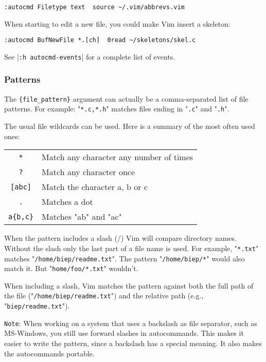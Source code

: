 {\begin{Verbatim}[samepage=true]
 :autocmd Filetype text  source ~/.vim/abbrevs.vim
\end{Verbatim}

When starting to edit a new file, you could make Vim insert a skeleton:

\begin{Verbatim}[samepage=true]
 :autocmd BufNewFile *.[ch]  0read ~/skeletons/skel.c
\end{Verbatim}

See |\verb!:h autocmd-events!| for a complete list of events.

\subsubsection{Patterns}
The \verb!{file_pattern}! argument can actually be a comma-separated list of file patterns.
For example: "\verb!*.c,*.h!" matches files ending in "\verb!.c!" and "\verb!.h!".

The usual file wildcards can be used.
Here is a summary of the most often used ones:

\begin{center} \begin{tabular}{c l}
				\verb;*; & Match any character any number of times \\
				\verb;?; & Match any character once \\
				\verb;[abc]; & Match the character a, b or c \\
				\verb;.; & Matches a dot \\
				\verb;a{b,c}; & Matches "ab" and "ac" \\
\end{tabular} \end{center}

When the pattern includes a slash (/) Vim will compare directory names.
Without the slash only the last part of a file name is used.
For example, "\verb!*.txt!" matches "\verb!/home/biep/readme.txt!".
The pattern "\verb!/home/biep/*!" would also match it.
But "\verb!home/foo/*.txt!" wouldn't.

When including a slash, Vim matches the pattern against both the full path of the file ("\verb!/home/biep/readme.txt!") and the relative path (e.g., "\verb!biep/readme.txt!").

\verb!Note!: When working on a system that uses a backslash as file separator, such as MS-Windows, you still use forward slashes in autocommands.
This makes it easier to write the pattern, since a backslash has a special meaning.
It also makes the autocommands portable.

}

